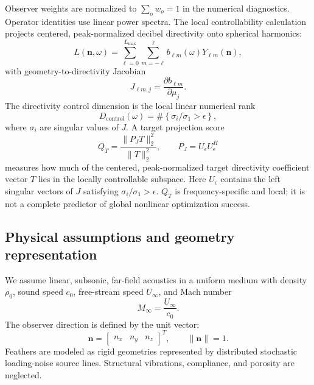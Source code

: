 \documentclass[11pt]{article}
\newcommand{\vect}[1]{\bm{#1}}
\begin{document}
Observer weights are normalized to $\sum_o w_o=1$ in the numerical diagnostics. Operator identities use linear power spectra. The local controllability calculation projects centered, peak-normalized decibel directivity onto spherical harmonics:
\begin{equation}
    L(\vect{n},\omega)
    =
    \sum_{\ell=0}^{L_{\max}}
    \sum_{m=-\ell}^{\ell}
    b_{\ell m}(\omega)
    Y_{\ell m}(\vect{n}),
\label{eq:spherical_directivity}
\end{equation}
with geometry-to-directivity Jacobian
\begin{equation}
    J_{\ell m,j}
    =
    \frac{\partial b_{\ell m}}{\partial \mu_j}.
\label{eq:controllability_jacobian}
\end{equation}
The directivity control dimension is the local linear numerical rank
\begin{equation}
    D_{\mathrm{control}}(\omega)
    =
    \#\left\{
        \sigma_i/\sigma_1>\epsilon
    \right\},
\label{eq:control_dimension}
\end{equation}
where $\sigma_i$ are singular values of $J$. A target projection score
\begin{equation}
    Q_T
    =
    \frac{\|P_JT\|_2^2}{\|T\|_2^2},
    \qquad
    P_J=U_\epsilon U_\epsilon^H
\label{eq:target_projection}
\end{equation}
measures how much of the centered, peak-normalized target directivity coefficient vector $T$ lies in the locally controllable subspace. Here $U_\epsilon$ contains the left singular vectors of $J$ satisfying $\sigma_i/\sigma_1>\epsilon$. $Q_T$ is frequency-specific and local; it is not a complete predictor of global nonlinear optimization success.

\subsection{Physical assumptions and geometry representation}

We assume linear, subsonic, far-field acoustics in a uniform medium with density $\rho_0$, sound speed $c_0$, free-stream speed $U_\infty$, and Mach number
\begin{equation}
    M_\infty = \frac{U_\infty}{c_0}.
\label{eq:mach}
\end{equation}
The observer direction is defined by the unit vector:
\begin{equation}
    \vect{n} =
    \begin{bmatrix}
    n_x & n_y & n_z
    \end{bmatrix}^{T},
    \qquad
    \|\vect{n}\| = 1.
\end{equation}
Feathers are modeled as rigid geometries represented by distributed stochastic loading-noise source lines. Structural vibrations, compliance, and porosity are neglected.
\end{document}
